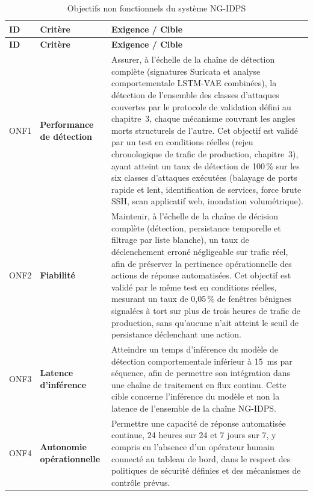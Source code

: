 \begin{longtable}{|p{}|p{}|p{}|}
\caption{Objectifs non fonctionnels du système NG-IDPS}
\label{tab:objectifs_non_fonctionnels} \\

\hline
\rowcolor[HTML]{EFEFEF}
\textbf{ID} & \textbf{Critère} & \textbf{Exigence / Cible} \\ \hline
\endfirsthead

\hline
\rowcolor[HTML]{EFEFEF}
\textbf{ID} & \textbf{Critère} & \textbf{Exigence / Cible} \\ \hline
\endhead

ONF1 &
\textbf{Performance de détection} &
Assurer, à l'échelle de la chaîne de détection complète (signatures Suricata et analyse comportementale LSTM-VAE combinées), la détection de l'ensemble des classes d'attaques couvertes par le protocole de validation défini au chapitre~3, chaque mécanisme couvrant les angles morts structurels de l'autre. Cet objectif est validé par un test en conditions réelles (rejeu chronologique de trafic de production, chapitre~3), ayant atteint un taux de détection de 100\,\% sur les six classes d'attaques exécutées (balayage de ports rapide et lent, identification de services, force brute SSH, scan applicatif web, inondation volumétrique). \\ \hline

ONF2 &
\textbf{Fiabilité} &
Maintenir, à l'échelle de la chaîne de décision complète (détection, persistance temporelle et filtrage par liste blanche), un taux de déclenchement erroné négligeable sur trafic réel, afin de préserver la pertinence opérationnelle des actions de réponse automatisées. Cet objectif est validé par le même test en conditions réelles, mesurant un taux de 0,05\,\% de fenêtres bénignes signalées à tort sur plus de trois heures de trafic de production, sans qu'aucune n'ait atteint le seuil de persistance déclenchant une action. \\ \hline

ONF3 &
\textbf{Latence d'inférence} &
Atteindre un temps d'inférence du modèle de détection comportementale inférieur à 15~ms par séquence, afin de permettre son intégration dans une chaîne de traitement en flux continu. Cette cible concerne l'inférence du modèle et non la latence de l'ensemble de la chaîne NG-IDPS. \\ \hline

ONF4 &
\textbf{Autonomie opérationnelle} &
Permettre une capacité de réponse automatisée continue, 24 heures sur 24 et 7 jours sur 7, y compris en l'absence d'un opérateur humain connecté au tableau de bord, dans le respect des politiques de sécurité définies et des mécanismes de contrôle prévus. \\ \hline


\end{longtable}
